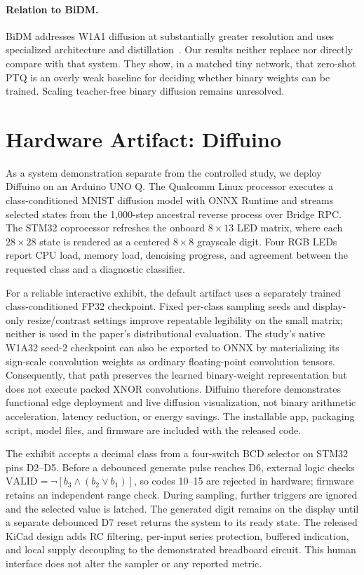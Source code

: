 \documentclass[conference]{IEEEtran}
\begin{document}
\paragraph{Relation to BiDM.}
BiDM addresses W1A1 diffusion at substantially greater resolution and uses
specialized architecture and distillation~\cite{bidm2024}. Our results neither
replace nor directly compare with that system. They show, in a matched tiny
network, that zero-shot PTQ is an overly weak baseline for deciding whether binary
weights can be trained. Scaling teacher-free binary diffusion remains unresolved.

\section{Hardware Artifact: Diffuino}

As a system demonstration separate from the controlled study, we deploy
Diffuino on an Arduino UNO Q. The Qualcomm Linux processor executes a
class-conditioned MNIST diffusion model with ONNX Runtime and streams selected
states from the 1,000-step ancestral reverse process over Bridge RPC. The STM32
coprocessor refreshes the onboard $8\times13$ LED matrix, where each $28\times28$
state is rendered as a centered $8\times8$ grayscale digit. Four RGB LEDs report
CPU load, memory load, denoising progress, and agreement between the requested
class and a diagnostic classifier.

For a reliable interactive exhibit, the default artifact uses a separately
trained class-conditioned FP32 checkpoint. Fixed per-class sampling seeds and
display-only resize/contrast settings improve repeatable legibility on the small
matrix; neither is used in the paper's distributional evaluation. The study's
native W1A32 seed-2 checkpoint can also be exported to ONNX by materializing its
sign-scale convolution weights as ordinary floating-point convolution tensors.
Consequently, that path preserves the learned binary-weight representation but
does not execute packed XNOR convolutions. Diffuino therefore demonstrates
functional edge deployment and live diffusion visualization, not binary
arithmetic acceleration, latency reduction, or energy savings. The installable
app, packaging script, model files, and firmware are included with the released
code.

The exhibit accepts a decimal class from a four-switch BCD selector on STM32
pins D2--D5. Before a debounced generate pulse reaches D6, external logic checks
$\mathrm{VALID}=\neg[b_3\wedge(b_2\vee b_1)]$, so codes 10--15 are rejected in
hardware; firmware retains an independent range check. During sampling, further
triggers are ignored and the selected value is latched. The generated digit
remains on the display until a separate debounced D7 reset returns the system to
its ready state. The released KiCad design adds RC filtering, per-input series
protection, buffered indication, and local supply decoupling to the demonstrated
breadboard circuit. This human interface does not alter the sampler or any
reported metric.
\end{document}
